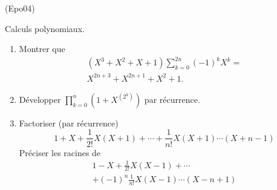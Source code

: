 \begin{tiny}(Epo04)\end{tiny} Calculs polynomiaux.
\begin{enumerate}
  \item  Montrer que
\begin{multline*}
(X^{3}+X^{2}+X+1)\sum_{k=0}^{2n}(-1)^{k}X^{k} =  \\X^{2n+3}+X^{2n+1}+X^{2}+1.
\end{multline*}

  \item Développer  $\prod_{k=0}^n \left( 1+X^{(2^{k})}\right)$ par récurrence.

  \item Factoriser (par récurrence)
\begin{displaymath}
  1 + X + \frac{1}{2!}X(X+1) + \cdots + \frac{1}{n!} X(X+1)\cdots (X+n-1)
\end{displaymath}
Préciser les racines de
\begin{multline*}
  1 - X + \frac{1}{2!}X(X-1) + \cdots \\ + (-1)^n\frac{1}{n!}X(X-1)\cdots (X-n+1) 
\end{multline*}

\end{enumerate}
